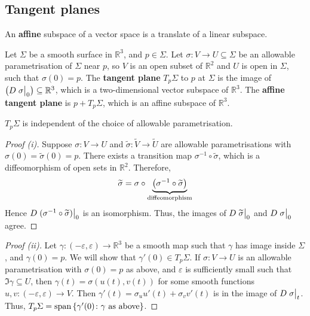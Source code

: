 \documentclass[a4paper,11pt]{article}
\begin{document}
\subsection{Tangent planes}
An \textbf{affine} subspace of a vector space is a translate of a linear subspace.
\begin{definition}
	Let \( \Sigma \) be a smooth surface in \( \mathbb R^3 \), and \( p \in \Sigma \).
	Let \( \sigma \colon V \to U \subseteq \Sigma \) be an allowable parametrisation of \( \Sigma \) near \( p \), so \( V \) is an open subset of \( \mathbb R^2 \) and \( U \) is open in \( \Sigma \), such that \( \sigma(0) = p \).
	The \textbf{tangent plane} \( T_p \Sigma \) to \( p \) at \( \Sigma \) is the image of \( \qty(D \eval{\sigma}_0) \subseteq \mathbb R^3 \), which is a two-dimensional vector subspace of \( \mathbb R^3 \).
	The \textbf{affine tangent plane} is \( p + T_p \Sigma \), which is an affine subspace of \( \mathbb R^3 \).
\end{definition}
\begin{lemma}
	\( T_p \Sigma \) is independent of the choice of allowable parametrisation.
\end{lemma}

\begin{proof}[Proof (i)]
	Suppose \( \sigma \colon V \to U \) and \( \widetilde \sigma \colon \widetilde V \to \widetilde U \) are allowable parametrisations with \( \sigma(0) = \widetilde \sigma(0) = p \).
	There exists a transition map \( \sigma^{-1} \circ \widetilde \sigma \), which is a diffeomorphism of open sets in \( \mathbb R^2 \).
	Therefore,
	\[
		\widetilde \sigma = \sigma \circ \underbrace{\qty(\sigma^{-1} \circ \widetilde \sigma)}_{\text{diffeomorphism}}
	\]
	Hence \( D\eval{(\sigma^{-1} \circ \widetilde \sigma)}_{0} \) is an isomorphism.
	Thus, the images of \( D \eval{\widetilde \sigma}_0 \) and \( D \eval{\sigma}_0 \) agree.
\end{proof}
\begin{proof}[Proof (ii)]
	Let \( \gamma \colon (-\varepsilon, \varepsilon) \to \mathbb R^3 \) be a smooth map such that \( \gamma \) has image inside \( \Sigma \), and \( \gamma(0) = p \).
	We will show that \( \gamma'(0) \in T_p \Sigma \).
	If \( \sigma \colon V \to U \) is an allowable parametrisation with \( \sigma(0) = p \) as above, and \( \varepsilon \) is sufficiently small such that \( \Im \gamma \subseteq U \), then \( \gamma(t) = \sigma(u(t), v(t)) \) for some smooth functions \( u, v \colon (-\varepsilon, \varepsilon) \to V \).
	Then \( \gamma'(t) = \sigma_u u'(t) + \sigma_v v'(t) \) is in the image of \( D \eval{\sigma}_t \).
	Thus, \( T_p \Sigma = \operatorname{span} \qty{ \gamma'(0) \colon \gamma \text{ as above} } \).
\end{proof}
\end{document}
